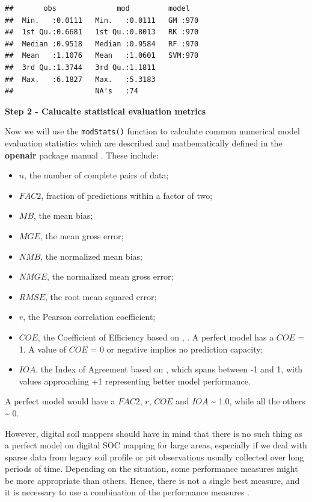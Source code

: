\documentclass[10pt,b5paper,]{book}
\providecommand{\tightlist}{%
  \setlength{\itemsep}{0pt}\setlength{\parskip}{0pt}}
\theoremstyle{definition}
\theoremstyle{definition}
\theoremstyle{definition}
\theoremstyle{remark}
\begin{document}
\begin{verbatim}
##       obs              mod         model    
##  Min.   :0.0111   Min.   :0.0111   GM :970  
##  1st Qu.:0.6681   1st Qu.:0.8013   RK :970  
##  Median :0.9518   Median :0.9584   RF :970  
##  Mean   :1.1076   Mean   :1.0601   SVM:970  
##  3rd Qu.:1.3744   3rd Qu.:1.1811            
##  Max.   :6.1827   Max.   :5.3183            
##                   NA's   :74
\end{verbatim}

\textbf{Step 2 - Calucalte statistical evaluation metrics}

Now we will use the \texttt{modStats()} function to calculate common
numerical model evaluation statistics which are described and
mathematically defined in the \textbf{openair} package manual \citep[Ch.
27, pp.~231-233]{carslaw2015openair}. These include:

\begin{itemize}
\tightlist
\item
  \(n\), the number of complete pairs of data;
\item
  \(FAC2\), fraction of predictions within a factor of two;
\item
  \(MB\), the mean bias;
\item
  \(MGE\), the mean gross error;
\item
  \(NMB\), the normalized mean bias;
\item
  \(NMGE\), the normalized mean gross error;
\item
  \(RMSE\), the root mean squared error;
\item
  \(r\), the Pearson correlation coefficient;
\item
  \(COE\), the Coefficient of Efficiency based on
  \citet{legates1999evaluating}, \citet{legates2013refined}. A perfect
  model has a \(COE\) = 1. A value of \(COE\) = 0 or negative implies no
  prediction capacity;
\item
  \(IOA\), the Index of Agreement based on \citet{willmott2012refined},
  which spans between -1 and 1, with values approaching +1 representing
  better model performance.
\end{itemize}

A perfect model would have a \(FAC2\), \(r\), \(COE\) and \(IOA\)
\textasciitilde{} 1.0, while all the others \textasciitilde{} 0.

However, digital soil mappers should have in mind that there is no such
thing as a perfect model on digital SOC mapping for large areas,
especially if we deal with sparse data from legacy soil profile or pit
observations usually collected over long periods of time. Depending on
the situation, some performance measures might be more appropriate than
others. Hence, there is not a single best measure, and it is necessary
to use a combination of the performance measures \citep{chang2004air}.
\end{document}
